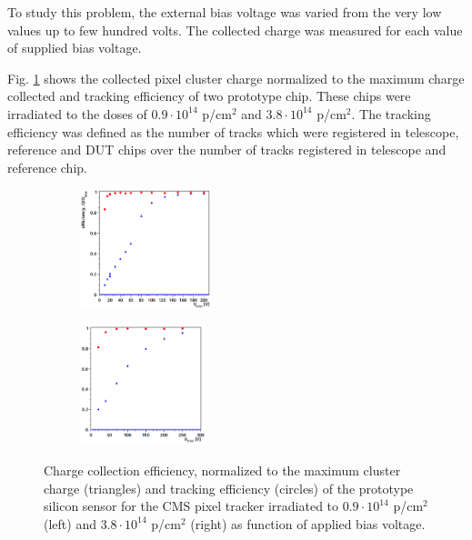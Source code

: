 To study this problem, the external bias voltage was varied from the very low values up to few hundred volts. The collected charge was
measured for each value of supplied bias voltage.

Fig. \ref{fig:depletion_voltage} shows the collected pixel cluster charge normalized to the maximum charge collected and tracking efficiency
of two prototype chip. These chips were irradiated to the doses of $0.9 \cdot 10^{14}$ p/cm$^2$ and $3.8 \cdot 10^{14}$ p/cm$^2$. 
The tracking efficiency was defined as the number of tracks which were registered in telescope, reference and DUT chips over the number
of tracks registered in telescope and reference chip.

\begin{figure}[t]
\centering
\begin{subfigure}
  \centering
  \includegraphics[width=0.42\textwidth]{021_pixel_upgrade/plots/voltage_scan_low_irrad.png}
\end{subfigure}
\begin{subfigure}
  \centering
  \includegraphics[width=0.4\textwidth]{021_pixel_upgrade/plots/voltage_scan_high_irrad.png}
\end{subfigure}
\caption{Charge collection efficiency, normalized to the maximum cluster charge (triangles) and tracking efficiency (circles) of the prototype silicon sensor
         for the CMS pixel tracker irradiated to $0.9 \cdot 10^{14}$ p/cm$^2$ (left) and $3.8 \cdot 10^{14}$ p/cm$^2$ (right) as function of applied bias voltage.}
\label{fig:depletion_voltage}
\end{figure}

